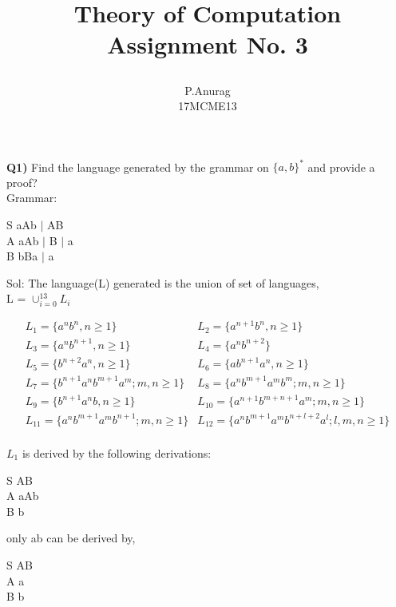 \documentclass[a4paper,10pt]{article}
\title{
  \begin{large}
    Theory of Computation
    Assignment No. 3
  \end{large}
}
\author{P.Anurag\\ 17MCME13}
\begin{document}
\maketitle
  \large{\bf Q1)} Find the language generated by the grammar on $\{a, b\}^*$ and provide a proof? \\
  Grammar:
  \begin{center}
    S \textrightarrow aAb $\mid$ AB \\
    A \textrightarrow aAb $\mid$ B $\mid$ a \\
    B \textrightarrow bBa $\mid$ a \\
  \end{center}
  \large{Sol: }
  The language(L) generated is the union of set of languages,\\
  L = $\cup_{i=0}^{13}L_i$

  \[
    \left.
      \begin{array}{ll}
        L_1 = \{a^nb^n, n \geq 1\} & L_2 = \{a^{n+1}b^n, n \geq 1\} \\
        L_3 = \{a^nb^{n+1}, n \geq 1\} & L_4 = \{a^nb^{n+2}\} \\
        L_5 = \{b^{n+2}a^n, n \geq 1\} & L_6 = \{ab^{n+1}a^n, n \geq 1\} \\
        L_7 = \{b^{n+1}a^nb^{m+1}a^m; m,n \geq 1\} & L_8 = \{a^nb^{m+1}a^mb^m; m,n \geq 1\} \\
        L_9 = \{b^{n+1}a^nb, n \geq 1\} & L_{10} = \{a^{n+1}b^{m+n+1}a^m; m,n \geq 1\} \\
        L_{11} = \{a^nb^{m+1}a^mb^{n+1}; m,n \geq 1\} & L_{12} = \{a^nb^{m+1}a^mb^{n+l+2}a^l; l,m,n \geq 1\} \\
      \end{array}
    \right.
  \]
  
  $L_1$ is derived by the following derivations:\\
  \begin{center}
    S \textrightarrow AB\\
    A \textrightarrow aAb\\
    B \textrightarrow b\\
  \end{center}
  only ab can be derived by,\\
  \begin{center}
    S \textrightarrow AB\\
    A \textrightarrow a\\
    B \textrightarrow b\\
  \end{center}
  
\end{document}
